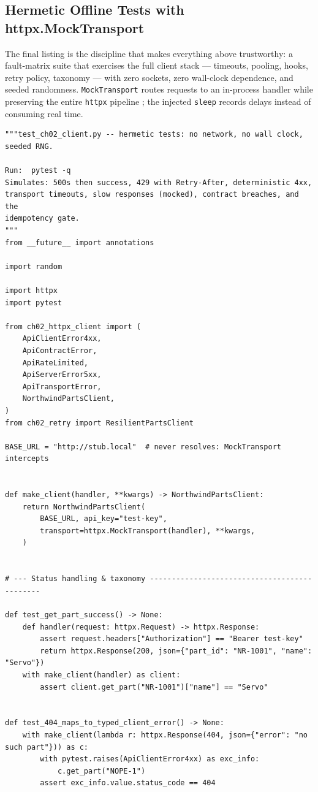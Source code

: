 \subsection{Hermetic Offline Tests with httpx.MockTransport}
\label{sec:ch02-tests}

The final listing is the discipline that makes everything above trustworthy:
a fault-matrix suite that exercises the full client stack --- timeouts,
pooling, hooks, retry policy, taxonomy --- with zero sockets, zero wall-clock
dependence, and seeded randomness. \texttt{MockTransport} routes requests to
an in-process handler while preserving the entire \texttt{httpx} pipeline
\cite{httpxdocs}; the injected \texttt{sleep} records delays instead of
consuming real time.

\begin{verbatim}
"""test_ch02_client.py -- hermetic tests: no network, no wall clock, seeded RNG.

Run:  pytest -q
Simulates: 500s then success, 429 with Retry-After, deterministic 4xx,
transport timeouts, slow responses (mocked), contract breaches, and the
idempotency gate.
"""
from __future__ import annotations

import random

import httpx
import pytest

from ch02_httpx_client import (
    ApiClientError4xx,
    ApiContractError,
    ApiRateLimited,
    ApiServerError5xx,
    ApiTransportError,
    NorthwindPartsClient,
)
from ch02_retry import ResilientPartsClient

BASE_URL = "http://stub.local"  # never resolves: MockTransport intercepts


def make_client(handler, **kwargs) -> NorthwindPartsClient:
    return NorthwindPartsClient(
        BASE_URL, api_key="test-key",
        transport=httpx.MockTransport(handler), **kwargs,
    )


# --- Status handling & taxonomy ---------------------------------------------

def test_get_part_success() -> None:
    def handler(request: httpx.Request) -> httpx.Response:
        assert request.headers["Authorization"] == "Bearer test-key"
        return httpx.Response(200, json={"part_id": "NR-1001", "name": "Servo"})
    with make_client(handler) as client:
        assert client.get_part("NR-1001")["name"] == "Servo"


def test_404_maps_to_typed_client_error() -> None:
    with make_client(lambda r: httpx.Response(404, json={"error": "no such part"})) as c:
        with pytest.raises(ApiClientError4xx) as exc_info:
            c.get_part("NOPE-1")
        assert exc_info.value.status_code == 404



\end{verbatim}
